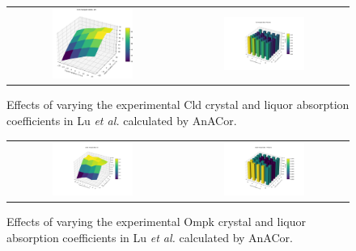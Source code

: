 \begin{figure}[h]
    \centering
    \begin{tabular}{cc}
    \includegraphics[width = 0.5\textwidth]{plots/exp0/cld_merged_Isig.png} & \includegraphics[trim={7.1cm 1cm 4.3cm 1cm},clip,width = 0.5\textwidth]{plots/exp0/cld_merged_rmerge.png} %
    \end{tabular}
    \caption{Effects of varying the experimental Cld crystal and liquor absorption coefficients in Lu \textit{et al.} calculated by AnACor.}
    \label{fig:cld_stats}
\end{figure}

\begin{figure}[H]
    \centering
    \begin{tabular}{cc}
    \includegraphics[width = 0.5\textwidth]{plots/exp0/ompk_merged_Isig.png} & \includegraphics[width = 0.5\textwidth]{plots/exp0/ompk_merged_rmerge.png}
    \end{tabular}
    \caption{Effects of varying the experimental Ompk crystal and liquor absorption coefficients in Lu \textit{et al.} calculated by AnACor.}
    \label{fig:ompk_stats}
\end{figure}



